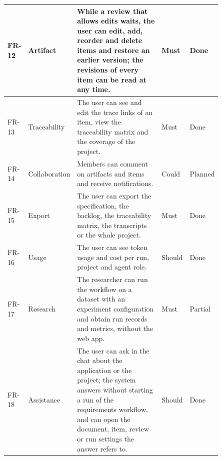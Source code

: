 \begin{longtable}{|p{0.08\linewidth}|p{0.16\linewidth}|p{0.41\linewidth}|p{0.09\linewidth}|p{0.11\linewidth}|}
    FR-12 & Artifact & While a review that allows edits waits, the user can edit, add, reorder and delete items and restore an earlier version; the revisions of every item can be read at any time. & Must & Done \\ \hline
    FR-13 & Traceability & The user can see and edit the trace links of an item, view the traceability matrix and the coverage of the project. & Must & Done \\ \hline
    FR-14 & Collaboration & Members can comment on artifacts and items and receive notifications. & Could & Planned \\ \hline
    FR-15 & Export & The user can export the specification, the backlog, the traceability matrix, the transcripts or the whole project. & Must & Done \\ \hline
    FR-16 & Usage & The user can see token usage and cost per run, project and agent role. & Should & Done \\ \hline
    FR-17 & Research & The researcher can run the workflow on a dataset with an experiment configuration and obtain run records and metrics, without the web app. & Must & Partial \\ \hline
    FR-18 & Assistance & The user can ask in the chat about the application or the project; the system answers without starting a run of the requirements workflow, and can open the document, item, review or run settings the answer refers to. & Should & Done \\ \hline
\end{longtable}
\endgroup
